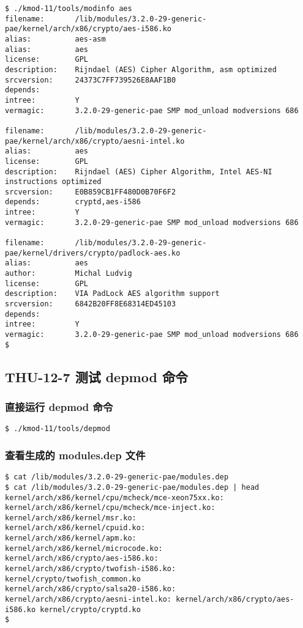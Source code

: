 \documentclass[11pt,a4paper]{article}
\begin{document}
{\begin{shaded}\begin{verbatim}
$ ./kmod-11/tools/modinfo aes 
filename:       /lib/modules/3.2.0-29-generic-pae/kernel/arch/x86/crypto/aes-i586.ko
alias:          aes-asm
alias:          aes
license:        GPL
description:    Rijndael (AES) Cipher Algorithm, asm optimized
srcversion:     24373C7FF739526E8AAF1B0
depends:        
intree:         Y
vermagic:       3.2.0-29-generic-pae SMP mod_unload modversions 686 

filename:       /lib/modules/3.2.0-29-generic-pae/kernel/arch/x86/crypto/aesni-intel.ko
alias:          aes
license:        GPL
description:    Rijndael (AES) Cipher Algorithm, Intel AES-NI instructions optimized
srcversion:     E0B859CB1FF480D0B70F6F2
depends:        cryptd,aes-i586
intree:         Y
vermagic:       3.2.0-29-generic-pae SMP mod_unload modversions 686 

filename:       /lib/modules/3.2.0-29-generic-pae/kernel/drivers/crypto/padlock-aes.ko
alias:          aes
author:         Michal Ludvig
license:        GPL
description:    VIA PadLock AES algorithm support
srcversion:     6842B20FF8E68314ED45103
depends:        
intree:         Y
vermagic:       3.2.0-29-generic-pae SMP mod_unload modversions 686 
$ 
\end{verbatim}\end{shaded}}
\subsection{THU-12-7 测试 depmod 命令}

\subsubsection{直接运行 depmod 命令}

{\begin{shaded}\begin{verbatim}
$ ./kmod-11/tools/depmod 
\end{verbatim}\end{shaded}}
\subsubsection{查看生成的 modules.dep 文件}

{\begin{shaded}\begin{verbatim}
$ cat /lib/modules/3.2.0-29-generic-pae/modules.dep
$ cat /lib/modules/3.2.0-29-generic-pae/modules.dep | head
kernel/arch/x86/kernel/cpu/mcheck/mce-xeon75xx.ko:
kernel/arch/x86/kernel/cpu/mcheck/mce-inject.ko:
kernel/arch/x86/kernel/msr.ko:
kernel/arch/x86/kernel/cpuid.ko:
kernel/arch/x86/kernel/apm.ko:
kernel/arch/x86/kernel/microcode.ko:
kernel/arch/x86/crypto/aes-i586.ko:
kernel/arch/x86/crypto/twofish-i586.ko: kernel/crypto/twofish_common.ko
kernel/arch/x86/crypto/salsa20-i586.ko:
kernel/arch/x86/crypto/aesni-intel.ko: kernel/arch/x86/crypto/aes-i586.ko kernel/crypto/cryptd.ko
$ 
\end{verbatim}\end{shaded}}
\end{document}
